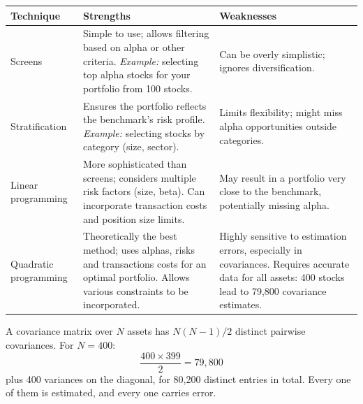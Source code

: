 \renewcommand{\arraystretch}{1.25}
\noindent\begin{tabularx}{\textwidth}{@{}>{\raggedright\arraybackslash}p{2.6cm}XX@{}}
\toprule
\textbf{\sffamily\small Technique} & \textbf{\sffamily\small Strengths} & \textbf{\sffamily\small Weaknesses} \\
\midrule
Screens & Simple to use; allows filtering based on alpha or other criteria. \emph{Example:} selecting top alpha stocks for your portfolio from 100 stocks. & Can be overly simplistic; ignores diversification. \\
Stratification & Ensures the portfolio reflects the benchmark's risk profile. \emph{Example:} selecting stocks by category (size, sector). & Limits flexibility; might miss alpha opportunities outside categories. \\
Linear programming & More sophisticated than screens; considers multiple risk factors (size, beta). Can incorporate transaction costs and position size limits. & May result in a portfolio very close to the benchmark, potentially missing alpha. \\
Quadratic programming & Theoretically the best method; uses alphas, risks and transactions costs for an optimal portfolio. Allows various constraints to be incorporated. & Highly sensitive to estimation errors, especially in covariances. Requires accurate data for all assets: 400 stocks lead to 79,800 covariance estimates. \\
\bottomrule
\end{tabularx}
\renewcommand{\arraystretch}{1}

\begin{imkeybox}[title={Where 79,800 comes from}]
A covariance matrix over $N$ assets has $N(N-1)/2$ distinct pairwise covariances.
For $N = 400$:
\[ \frac{400 \times 399}{2} = 79{,}800 \]
plus 400 variances on the diagonal, for 80,200 distinct entries in total. Every
one of them is estimated, and every one carries error.
\end{imkeybox}


